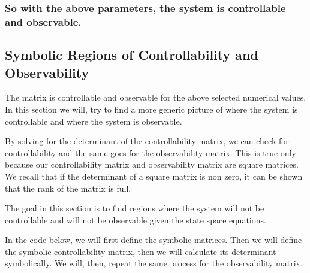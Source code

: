 \documentclass[11pt]{article}
\begin{document}
\subsubsection{So with the above parameters, the system is controllable
and
observable.}\label{so-with-the-above-parameters-the-system-is-controllable-and-observable.}

\subsection{Symbolic Regions of Controllability and
Observability}\label{symbolic-regions-of-controllability-and-observability}

The matrix is controllable and observable for the above selected
numerical values. In this section we will, try to find a more generic
picture of where the system is controllable and where the system is
observable.

By solving for the determinant of the controllability matrix, we can
check for controllability and the same goes for the observability
matrix. This is true only because our controllability matrix and
observability matrix are square matrices. We recall that if the
determinant of a square matrix is non zero, it can be shown that the
rank of the matrix is full.

The goal in this section is to find regions where the system will not be
controllable and will not be observable given the state space equations.

In the code below, we will first define the symbolic matrices. Then we
will define the symbolic controllability matrix, then we will calculate
its determinant symbolically. We will, then, repeat the same process for
the observability matrix.
\end{document}
